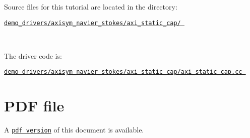 \begin{DoxyItemize}
\item Source files for this tutorial are located in the directory\+:~\newline
~\newline
\begin{center} \href{../../../../demo_drivers/axisym_navier_stokes/axi_static_cap/}{\tt demo\+\_\+drivers/axisym\+\_\+navier\+\_\+stokes/axi\+\_\+static\+\_\+cap/ } \end{center} ~\newline

\item The driver code is\+: ~\newline
~\newline
\begin{center} \href{../../../../demo_drivers/axisym_navier_stokes/axi_static_cap/axi_static_cap.cc}{\tt demo\+\_\+drivers/axisym\+\_\+navier\+\_\+stokes/axi\+\_\+static\+\_\+cap/axi\+\_\+static\+\_\+cap.\+cc } \end{center} 
\end{DoxyItemize}

 

 \hypertarget{index_pdf}{}\section{P\+D\+F file}\label{index_pdf}
A \href{../latex/refman.pdf}{\tt pdf version} of this document is available. 
